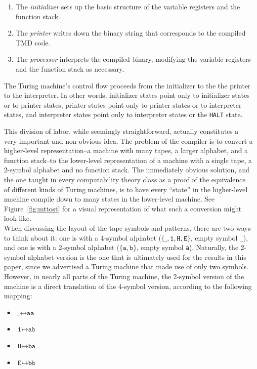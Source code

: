 \documentclass[11pt]{article}
\begin{document}
\begin{enumerate}
\item The \emph{initializer} sets up the basic structure of the variable registers and the function stack.
\item The \emph{printer} writes down the binary string that corresponds to the compiled TMD code.
\item The \emph{processor} interprets the compiled binary, modifying the variable registers and the function stack as necessary.
\end{enumerate}

The Turing machine's control flow proceeds from the initializer to the the printer to the interpreter. In other words, initializer states point only to initializer states or to printer states, printer states point only to printer states or to interpreter states, and interpreter states point only to interpreter states or the \texttt{HALT} state. 

This division of labor, while seemingly straightforward, actually constitutes a very important and non-obvious idea. The problem of the compiler is to convert a higher-level representation--a machine with many tapes, a larger alphabet, and a function stack--to the lower-level representation of a machine with a single tape, a 2-symbol alphabet and no function stack. The immediately obvious solution, and the one taught in every computability theory class as a proof of the equivalence of different kinds of Turing machines, is to have every ``state'' in the higher-level machine compile down to many states in the lower-level machine. See Figure~\ref{fig:mttost} for a visual representation of what such a conversion might look like. \\


When discussing the layout of the tape symbols and patterns, there are two ways to think about it: one is with a 4-symbol alphabet ($\{\texttt{\_}, \texttt{1}, \texttt{H}, \texttt{E}\}$, empty symbol \texttt{\_}), and one is with a 2-symbol alphabet ($\{\texttt{a}, \texttt{b}\}$, empty symbol \texttt{a}). Naturally, the 2-symbol alphabet version is the one that is ultimately used for the results in this paper, since we advertised a Turing machine that made use of only two symbols. However, in nearly all parts of the Turing machine, the 2-symbol version of the machine is a direct translation of the 4-symbol version, according to the following mapping:

\begin{itemize}
\item $\texttt{\_} \leftrightarrow \texttt{aa}$
\item $\texttt{1} \leftrightarrow \texttt{ab}$
\item $\texttt{H} \leftrightarrow \texttt{ba}$
\item $\texttt{E} \leftrightarrow \texttt{bb}$
\end{itemize}
\end{document}
